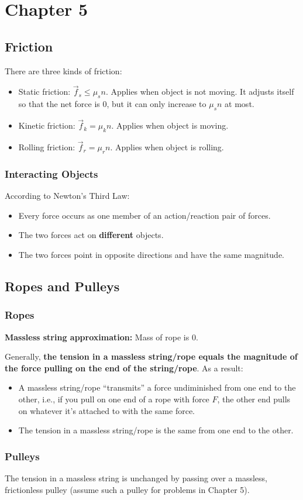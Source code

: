 \section{Chapter 5}

\subsection{Friction}

There are three kinds of friction:

\begin{itemize}
    \item Static friction: $\Vec{f}_s \leq \mu_s n$. Applies when object is not moving. It adjusts itself so that the net force is 0, but it can only increase to $\mu_s n$ at most.
    \item Kinetic friction: $\Vec{f}_k = \mu_k n$. Applies when object is moving.
    \item Rolling friction: $\Vec{f}_r = \mu_r n$. Applies when object is rolling.
\end{itemize}

\subsubsection{Interacting Objects}

According to Newton's Third Law:

\begin{itemize}
    \item Every force occurs as one member of an action/reaction pair of forces.
    \item The two forces act on \textbf{different} objects.
    \item The two forces point in opposite directions and have the same magnitude.
\end{itemize}

\subsection{Ropes and Pulleys}

\subsubsection{Ropes}

\textbf{Massless string approximation:} Mass of rope is 0.

Generally, \textbf{the tension in a massless string/rope equals the magnitude
    of the force pulling on the end of the string/rope}. As a result:
\begin{itemize}
    \item A massless string/rope ``transmits'' a force undiminished from one end
          to the other, i.e., if you pull on one end of a rope with force $F$,
          the other end pulls on whatever it's attached to with the same force.
    \item The tension in a massless string/rope is the same from one end to the
          other.
\end{itemize}

\subsubsection{Pulleys}

The tension in a massless string is unchanged by passing over a massless,
frictionless pulley (assume such a pulley for problems in Chapter 5).
